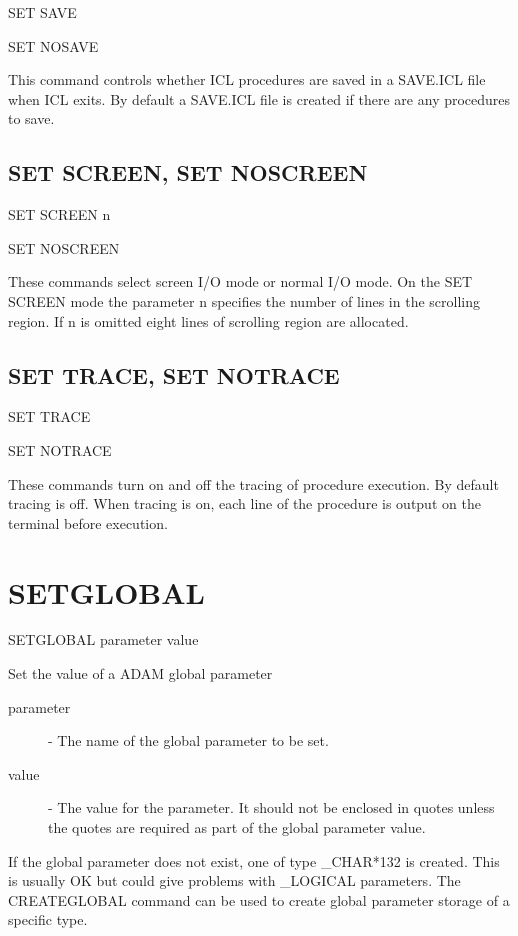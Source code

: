 \documentclass[twoside,11pt]{report}
\newcommand{\xlabel}[1]{}
\begin{document}
   SET SAVE

   SET NOSAVE

This command controls whether ICL procedures are saved in a SAVE.ICL file
when ICL exits. By default a SAVE.ICL file is created if there are any
procedures to save.

\subsection{\xlabel{SET_SCREEN}SET SCREEN, SET NOSCREEN\label{SET_SCREEN}}

   SET SCREEN n

   SET NOSCREEN

These commands select screen I/O mode or normal I/O mode. On the SET SCREEN
mode the parameter n specifies the number of lines in the scrolling region.
If n is omitted eight lines of scrolling region are allocated.

\subsection{\xlabel{SET_TRACE}SET TRACE, SET NOTRACE\label{SET_TRACE}}

   SET TRACE

   SET NOTRACE

These commands turn on and off the tracing of procedure execution. By
default tracing is off. When tracing is on, each line of the procedure is
output on the terminal before execution.



\section{\xlabel{SETGLOBAL}SETGLOBAL\label{SETGLOBAL}}

   SETGLOBAL \hspace{.5cm}  parameter \hspace{.5cm} value

Set the value of a ADAM global parameter

\begin{description}

\item[parameter] - The name of the global parameter to be set.

\item[value] - The value for the parameter. It should not be enclosed in quotes
unless the quotes are required as part of the global parameter value.

\end{description}
If the global parameter does not exist, one of type \_CHAR*132 is created.
This is usually OK but could give problems with \_LOGICAL parameters.
The CREATEGLOBAL command can be used to create global parameter storage of a
specific type.
\end{document}
